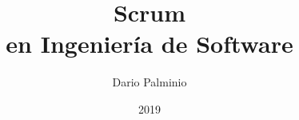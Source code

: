 
\title{\Huge 
    \textbf{Scrum}  \\ 
    \huge en Ingeniería de Software
    }

\author{Dario Palminio}

\date{2019} 

\maketitle
